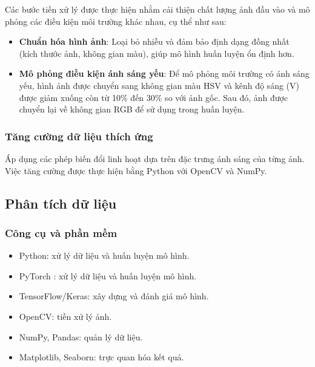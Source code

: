 Các bước tiền xử lý được thực hiện nhằm cải thiện chất lượng ảnh đầu vào và mô phỏng các điều kiện môi trường khác nhau, cụ thể như sau:

\begin{itemize}
    \item \textbf{Chuẩn hóa hình ảnh}: Loại bỏ nhiễu và đảm bảo định dạng đồng nhất (kích thước ảnh, không gian màu), giúp mô hình huấn luyện ổn định hơn.
    
    \item \textbf{Mô phỏng điều kiện ánh sáng yếu}: Để mô phỏng môi trường có ánh sáng yếu, hình ảnh được chuyển sang không gian màu HSV và kênh độ sáng (V) được giảm xuống còn từ 10\% đến 30\% so với ảnh gốc. Sau đó, ảnh được chuyển lại về không gian RGB để sử dụng trong huấn luyện.
\end{itemize}

\subsubsection{Tăng cường dữ liệu thích ứng}
Áp dụng các phép biến đổi linh hoạt dựa trên đặc trưng ánh sáng của từng ảnh. Việc tăng cường được thực hiện bằng Python với OpenCV và NumPy.

\subsection{Phân tích dữ liệu}
\subsubsection{Công cụ và phần mềm}
\begin{itemize}
    \item Python: xử lý dữ liệu và huấn luyện mô hình.
    \item PyTorch : xử lý dữ liệu và huấn luyện mô hình.
    \item TensorFlow/Keras: xây dựng và đánh giá mô hình.
    \item OpenCV: tiền xử lý ảnh.
    \item NumPy, Pandas: quản lý dữ liệu.
    \item Matplotlib, Seaborn: trực quan hóa kết quả.
\end{itemize}

